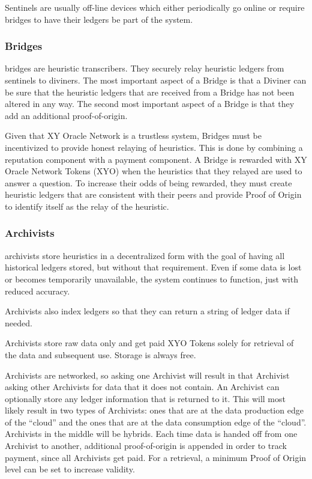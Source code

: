 \documentclass{article}
\begin{document}
Sentinels are usually off-line devices which either periodically go online or require \Glspl{bridge} to have their ledgers be part of the system.

\subsubsection {Bridges}
\Glspl{bridge} are \gls{heuristic} transcribers. They securely relay heuristic ledgers from \Glspl{sentinel} to \Glspl{diviner}. The most important aspect of a Bridge is that a Diviner can be sure that the heuristic ledgers that are received from a Bridge has not been altered in any way. The second most important aspect of a Bridge is that they add an additional \Gls{proof-of-origin}.

Given that XY Oracle Network is a trustless system, Bridges must be incentivized to provide honest relaying of heuristics. This is done by combining a reputation component with a payment component. A Bridge is rewarded with XY Oracle Network Tokens (XYO) when the heuristics that they relayed are used to answer a question. To increase their odds of being rewarded, they must create heuristic ledgers that are consistent with their peers and provide Proof of Origin to identify itself as the relay of the heuristic.

\subsubsection {Archivists}
\Glspl{archivist} store \glspl{heuristic} in a decentralized form with the goal of having all historical ledgers stored, but without that requirement. Even if some data is lost or becomes temporarily unavailable, the system continues to function, just with reduced \gls{accuracy}.

Archivists also index ledgers so that they can return a string of ledger data if needed.

Archivists store raw data only and get paid XYO Tokens solely for retrieval of the data and subsequent use. Storage is always free.

Archivists are networked, so asking one Archivist will result in that Archivist asking other Archivists for data that it does not contain. An Archivist can optionally store any ledger information that is returned to it. This will most likely result in two types of Archivists: ones that are at the data production edge of the ``cloud'' and the ones that are at the data consumption edge of the ``cloud''. Archivists in the middle will be hybrids. Each time data is handed off from one Archivist to another, additional \Gls{proof-of-origin} is appended in order to track payment, since all Archivists get paid. For a retrieval, a minimum Proof of Origin level can be set to increase validity.
\end{document}
